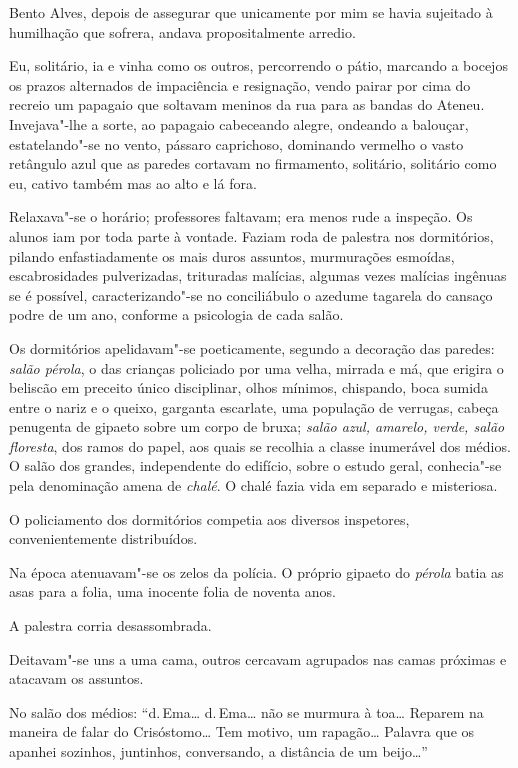 Bento Alves, depois de assegurar que unicamente por mim se havia
sujeitado à humilhação que sofrera, andava propositalmente arredio. 

Eu, solitário, ia e vinha como os outros, percorrendo o pátio, marcando a
bocejos os prazos alternados de impaciência e resignação, vendo pairar
por cima do recreio um papagaio que soltavam meninos da rua para as
bandas do Ateneu. Invejava"-lhe a sorte, ao papagaio cabeceando
alegre, ondeando a balouçar, estatelando"-se no vento, pássaro
caprichoso, dominando vermelho o vasto retângulo azul que as paredes
cortavam no firmamento, solitário, solitário como eu, cativo também mas
ao alto e lá fora. 

Relaxava"-se o horário; professores faltavam; era
menos rude a inspeção. Os alunos iam por toda parte à vontade. Faziam
roda de palestra nos dormitórios, pilando enfastiadamente os mais duros
assuntos, murmurações esmoídas, escabrosidades pulverizadas, trituradas
malícias, algumas vezes malícias ingênuas se é possível, caracterizando"-se no conciliábulo o
azedume tagarela do cansaço podre de um ano, conforme a psicologia de
cada salão. 

Os dormitórios apelidavam"-se poeticamente, segundo a
decoração das paredes: \textit{salão pérola}, o das crianças policiado por uma
velha, mirrada e má, que erigira o beliscão em preceito único
disciplinar, olhos mínimos, chispando, boca sumida entre o nariz e o
queixo, garganta escarlate, uma população de verrugas, cabeça penugenta
de gipaeto sobre um corpo de bruxa; \textit{salão azul, amarelo, verde, salão
floresta}, dos ramos do papel, aos quais se recolhia a classe inumerável
dos médios. O salão dos grandes, independente do edifício, sobre o
estudo geral, conhecia"-se pela denominação amena de \textit{chalé}. O chalé
fazia vida em separado e misteriosa. 

O policiamento dos dormitórios
competia aos diversos inspetores, convenientemente distribuídos. 

Na época atenuavam"-se os zelos da polícia. O próprio gipaeto do \textit{pérola}
batia as asas para a folia, uma inocente folia de noventa anos. 

A palestra corria desassombrada. 

Deitavam"-se uns a uma cama, outros
cercavam agrupados nas camas próximas e atacavam os assuntos. 

No salão dos médios: ``d.\,Ema\ldots{} d.\,Ema\ldots{} não se murmura à toa\ldots{} Reparem na
maneira de falar do Crisóstomo\ldots{} Tem motivo, um rapagão\ldots{} Palavra que
os apanhei sozinhos, juntinhos, conversando, a distância de um beijo\ldots{}''

